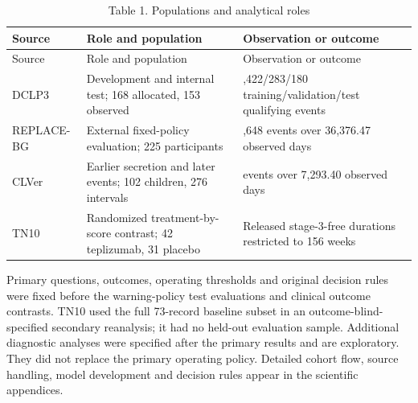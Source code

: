 \documentclass[
  american,
  11pt,
  letterpaper,
]{article}
\begin{document}
\Needspace{2.7in}
\begin{longtable}[]{@{}
  >{\raggedright\arraybackslash}p{}
  >{\raggedright\arraybackslash}p{}
  >{\raggedright\arraybackslash}p{}@{}}
\caption{Table 1. Populations and analytical roles}\tabularnewline
\toprule\noalign{}
\begin{minipage}[b]{\linewidth}\raggedright
Source
\end{minipage} & \begin{minipage}[b]{\linewidth}\raggedright
Role and population
\end{minipage} & \begin{minipage}[b]{\linewidth}\raggedright
Observation or outcome
\end{minipage} \\
\midrule\noalign{}
\endfirsthead
\toprule\noalign{}
\begin{minipage}[b]{\linewidth}\raggedright
Source
\end{minipage} & \begin{minipage}[b]{\linewidth}\raggedright
Role and population
\end{minipage} & \begin{minipage}[b]{\linewidth}\raggedright
Observation or outcome
\end{minipage} \\
\midrule\noalign{}
\endhead
\bottomrule\noalign{}
\endlastfoot
DCLP3 & Development and internal test; 168 allocated, 153 observed &
1,422/283/180 training/validation/test qualifying events \\
REPLACE-BG & External fixed-policy evaluation; 225 participants & 8,648
events over 36,376.47 observed days \\
CLVer & Earlier secretion and later events; 102 children, 276 intervals
& 408 events over 7,293.40 observed days \\
TN10 & Randomized treatment-by-score contrast; 42 teplizumab, 31 placebo
& Released stage-3-free durations restricted to 156 weeks \\
\end{longtable}

Primary questions, outcomes, operating thresholds and original decision
rules were fixed before the warning-policy test evaluations and clinical
outcome contrasts. TN10 used the full 73-record baseline subset in an
outcome-blind-specified secondary reanalysis; it had no held-out
evaluation sample. Additional diagnostic analyses were specified after
the primary results and are exploratory. They did not replace the
primary operating policy. Detailed cohort flow, source handling, model
development and decision rules appear in the scientific appendices.
\end{document}
